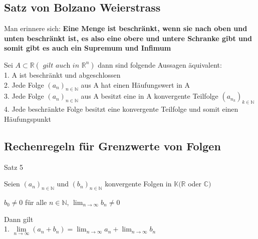 \documentclass[smallheadings,headsepline,12pt,a4paper]{scrartcl}
\begin{document}
\subsection*{Satz von Bolzano Weierstrass}

\item Man erinnere sich: \textbf{Eine Menge ist beschränkt, wenn sie nach oben und unten beschränkt ist, es also eine obere und untere Schranke gibt und somit gibt es auch ein Supremum und Infimum}
\item Sei $ A \subset \mathbb{R} ( \textit{ gilt auch in }  \mathbb{R}^n  ) $ dann sind folgende Aussagen äquivalent: \\

1. A ist beschränkt und abgeschlossen \\

2. Jede Folge $(a_n)_{n\in \mathbb{N}}$ aus A hat einen Häufungswert in A \\

3. Jede Folge $(a_n)_{n\in \mathbb{N}} $ aus A besitzt eine in A konvergente Teilfolge $(a_{n_k})_{k\in \mathbb{N}} $ \\

4. Jede beschränkte Folge besitzt eine konvergente Teilfolge und somit einen Häufungspunkt \\



\newpage

\subsection*{Rechenregeln für Grenzwerte von Folgen}

\item[Satz 5]

Seien $(a_n)_{n\in \mathbb{N}}$ und $(b_n)_{n\in \mathbb{N}}$ konvergente Folgen in $\mathbb{K}(\mathbb{R}$ oder $\mathbb{C})$ \\

\begin{center}
$b_0 \neq 0 $ für alle $n \in \mathbb{N}$, $\lim_{n \rightarrow \infty} b_n \neq 0 $ \\
\end{center}

Dann gilt \\

1. $\lim\limits_{n \rightarrow \infty} (a_n + b_n) = \lim_{n \rightarrow \infty} a_n + \lim_{n \rightarrow \infty} b_n $ \\
\end{document}
